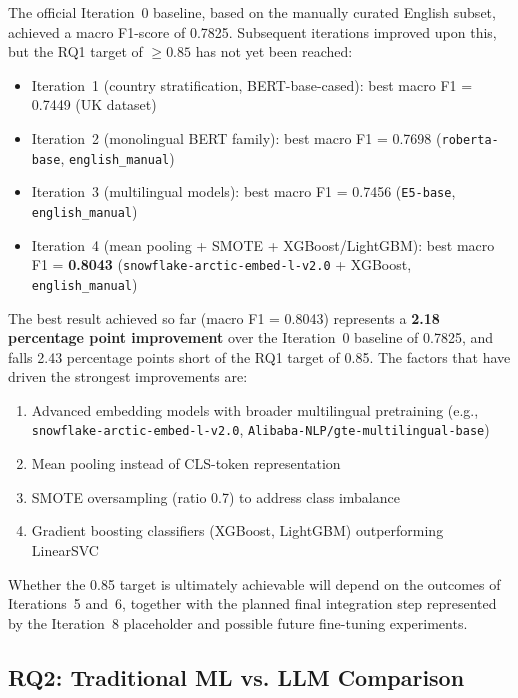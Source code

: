 \documentclass[11pt, titlepage, bibliography=totoc]{scrreprt}
\begin{document}
The official Iteration~0 baseline, based on the manually curated English subset, achieved a macro F1-score of 0.7825. Subsequent iterations improved upon this, but the RQ1 target of $\geq 0.85$ has not yet been reached:

\begin{itemize}
    \item Iteration~1 (country stratification, BERT-base-cased): best macro F1 = 0.7449 (UK dataset)
    \item Iteration~2 (monolingual BERT family): best macro F1 = 0.7698 (\texttt{roberta-base}, \texttt{english\_manual})
    \item Iteration~3 (multilingual models): best macro F1 = 0.7456 (\texttt{E5-base}, \texttt{english\_manual})
    \item Iteration~4 (mean pooling + SMOTE + XGBoost/LightGBM): best macro F1 = \textbf{0.8043} (\texttt{snowflake-arctic-embed-l-v2.0} + XGBoost, \texttt{english\_manual})
\end{itemize}

The best result achieved so far (macro F1 = 0.8043) represents a \textbf{2.18 percentage point improvement} over the Iteration~0 baseline of 0.7825, and falls 2.43 percentage points short of the RQ1 target of 0.85. The factors that have driven the strongest improvements are:

\begin{enumerate}
    \item Advanced embedding models with broader multilingual pretraining (e.g., \texttt{snowflake-arctic-embed-l-v2.0}, \texttt{Alibaba-NLP/gte-multilingual-base})
    \item Mean pooling instead of CLS-token representation
    \item SMOTE oversampling (ratio 0.7) to address class imbalance
    \item Gradient boosting classifiers (XGBoost, LightGBM) outperforming LinearSVC
\end{enumerate}

Whether the 0.85 target is ultimately achievable will depend on the outcomes of Iterations~5 and~6, together with the planned final integration step represented by the Iteration~8 placeholder and possible future fine-tuning experiments.

\subsection{RQ2: Traditional ML vs. LLM Comparison}
\end{document}
